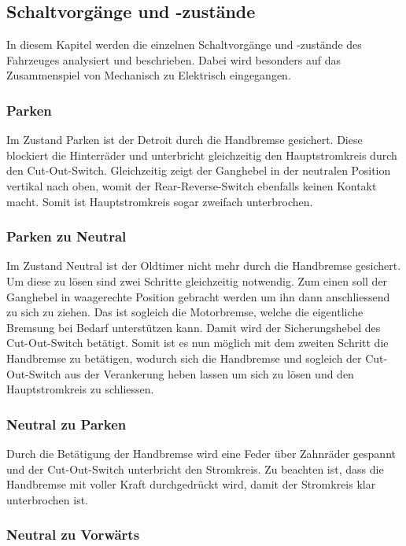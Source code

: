 \subsection{Schaltvorgänge und -zustände}

In diesem Kapitel werden die einzelnen Schaltvorgänge und -zustände des Fahrzeuges analysiert und beschrieben. Dabei wird besonders auf das Zusammenspiel von Mechanisch zu Elektrisch eingegangen.

\subsubsection{Parken}

Im Zustand Parken ist der Detroit durch die Handbremse gesichert. Diese blockiert die Hinterräder und unterbricht gleichzeitig den Hauptstromkreis durch den Cut-Out-Switch. Gleichzeitig zeigt der Ganghebel in der neutralen Position vertikal nach oben, womit der Rear-Reverse-Switch ebenfalls keinen Kontakt macht. Somit ist Hauptstromkreis sogar zweifach unterbrochen.

\subsubsection{Parken zu Neutral}

Im Zustand Neutral ist der Oldtimer nicht mehr durch die Handbremse gesichert. Um diese zu lösen sind zwei Schritte gleichzeitig notwendig. Zum einen soll der Ganghebel in waagerechte Position gebracht werden um ihn dann anschliessend zu sich zu ziehen. Das ist sogleich die Motorbremse, welche die eigentliche Bremsung bei Bedarf unterstützen kann. Damit wird der Sicherungshebel des Cut-Out-Switch betätigt. Somit ist es nun möglich mit dem zweiten Schritt die Handbremse zu betätigen, wodurch sich die Handbremse und sogleich der Cut-Out-Switch aus der Verankerung heben lassen um sich zu lösen und den Hauptstromkreis zu schliessen.

\subsubsection{Neutral zu Parken}

Durch die Betätigung der Handbremse wird eine Feder über Zahnräder gespannt und der Cut-Out-Switch unterbricht den Stromkreis. Zu beachten ist, dass die Handbremse mit voller Kraft durchgedrückt wird, damit der Stromkreis klar unterbrochen ist.

\subsubsection{Neutral zu Vorwärts}

